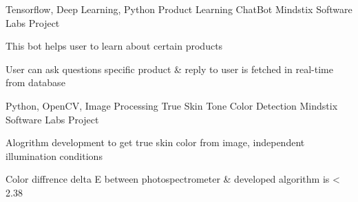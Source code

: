 

\begin{cventries}


  \cventry
    {Tensorflow, Deep Learning, Python} %
    {Product Learning ChatBot} %
    {Mindstix Software Labs Project} %
    {} %
    {
      \begin{cvitems} %
        \item {This bot helps user to learn about certain products}
        \item {User can ask questions specific product \& reply to user is fetched in real-time from database}
      \end{cvitems}
    }
    
    \cventry
    {Python, OpenCV, Image Processing} %
    {True Skin Tone Color Detection} %
    {Mindstix Software Labs Project} %
    {} %
    {
      \begin{cvitems} %
        \item {Alogrithm development to get true skin color from image, independent illumination conditions}
        \item {Color diffrence delta E between photospectrometer \& developed algorithm is < 2.38 }
      \end{cvitems}
    }
    

\end{cventries}

